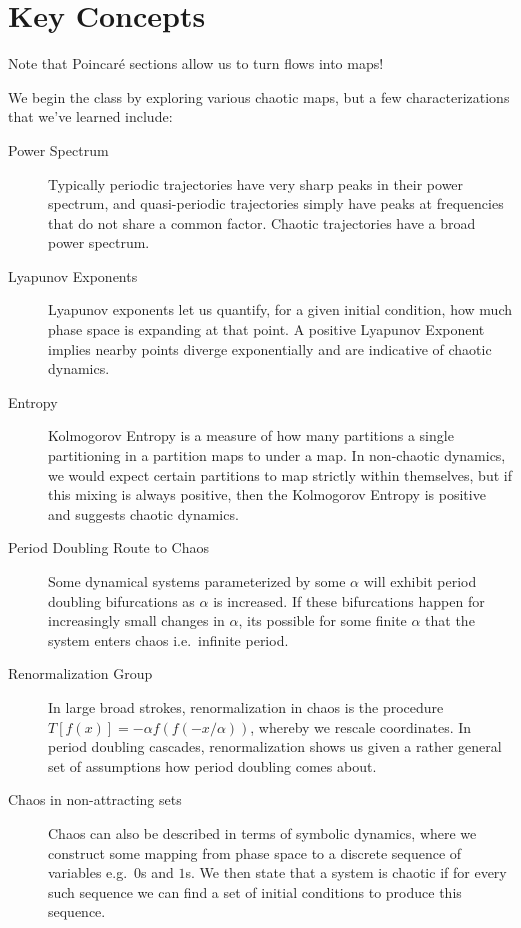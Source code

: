 \documentclass[12pt]{article}
\begin{document}
\onehalfspacing

\pagestyle{fancy}
\cfoot{\thepage/\pageref{LastPage}}

\tableofcontents
\clearpage

\section{Key Concepts}

Note that Poincar\'e sections allow us to turn flows into maps!

We begin the class by exploring various chaotic maps, but a few
characterizations that we've learned include:
\begin{description}
    \item[Power Spectrum] Typically periodic trajectories have very sharp peaks
        in their power spectrum, and quasi-periodic trajectories simply have
        peaks at frequencies that do not share a common factor. Chaotic
        trajectories have a broad power spectrum.

    \item[Lyapunov Exponents] Lyapunov exponents let us quantify, for a given
        initial condition, how much phase space is expanding at that point. A
        positive Lyapunov Exponent implies nearby points diverge exponentially
        and are indicative of chaotic dynamics.

    \item[Entropy] Kolmogorov Entropy is a measure of how many partitions a
        single partitioning in a partition maps to under a map. In non-chaotic
        dynamics, we would expect certain partitions to map strictly within
        themselves, but if this mixing is always positive, then the Kolmogorov
        Entropy is positive and suggests chaotic dynamics.

    \item[Period Doubling Route to Chaos] Some dynamical systems parameterized
        by some $\alpha$ will exhibit period doubling bifurcations as $\alpha$
        is increased. If these bifurcations happen for increasingly small
        changes in $\alpha$, its possible for some finite $\alpha$ that the
        system enters chaos i.e.\ infinite period.

    \item[Renormalization Group] In large broad strokes, renormalization in
        chaos is the procedure $T[f(x)] = -\alpha f(f(-x/\alpha))$, whereby we
        rescale coordinates. In period doubling cascades, renormalization shows
        us given a rather general set of assumptions how period doubling comes
        about.

    \item[Chaos in non-attracting sets] Chaos can also be described in terms of
        symbolic dynamics, where we construct some mapping from phase space to a
        discrete sequence of variables e.g.\ $0$s and $1$s. We then state that a
        system is chaotic if for every such sequence we can find a set of
        initial conditions to produce this sequence.
\end{description}
\end{document}
